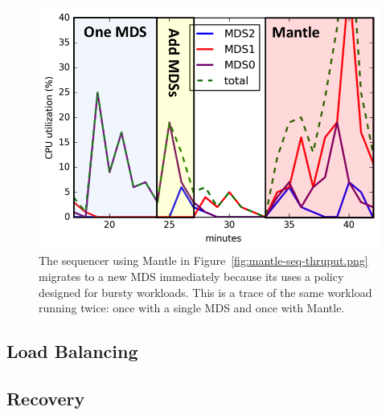 \documentclass[10pt,twocolumn]{article}
\begin{document}
\begin{figure}[h]
\centering
\includegraphics{figures/mantle-cpu-utilization-annotate.png}
\caption{The sequencer using Mantle in Figure~\ref{fig:mantle-seq-thruput.png} migrates to a new MDS immediately because its uses a policy designed for bursty workloads. This is a trace of the same workload running twice: once with a single MDS and once with Mantle.}
\label{fig:mantle-cpu-utilization}
\end{figure}

\subsection{Load Balancing}

\subsection{Recovery}


%
%
%
\end{document}
